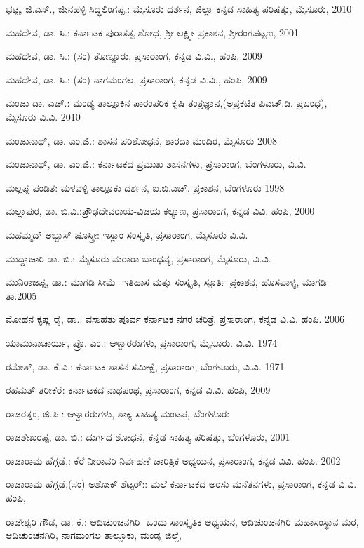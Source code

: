 \noindent
ಭಟ್ಟ, ಜಿ.ಎಸ್​., ಜೀನಹಳ್ಳಿ ಸಿದ್ಧಲಿಂಗಪ್ಪ,: ಮೈಸೂರು ದರ್ಶನ, ಜಿಲ್ಲಾ ಕನ್ನಡ ಸಾಹಿತ್ಯ ಪರಿಷತ್ತು, ಮೈಸೂರು, 2010

\noindent
ಮಹದೇವ, ಡಾ. ಸಿ.: ಕರ್ನಾಟಕ ಪುರಾತತ್ವ ಶೋಧ, ಶ‍್ರೀ ಲಕ್ಷ್ಮೀ ಪ್ರಕಾಶನ, ಶ‍್ರೀರಂಗಪಟ್ಟಣ, 2001

\noindent
ಮಹದೇವ, ಡಾ. ಸಿ.: (ಸಂ) ತೊಣ್ಣೂರು, ಪ್ರಸಾರಾಂಗ, ಕನ್ನಡ ವಿ.ವಿ., ಹಂಪಿ, 2009

\noindent
ಮಹದೇವ, ಡಾ. ಸಿ.: (ಸಂ) ನಾಗಮಂಗಲ, ಪ್ರಸಾರಾಂಗ, ಕನ್ನಡ ವಿ.ವಿ., ಹಂಪಿ, 2009

\noindent
ಮಂಜು ಡಾ. ಎಚ್​.: ಮಂಡ್ಯ ತಾಲ್ಲೂಕಿನ ಪಾರಂಪರಿಕ ಕೃಷಿ ತಂತ್ರಜ್ಞಾನ,(ಅಪ್ರಕಟಿತ ಪಿಎಚ್​.ಡಿ. ಪ್ರಬಂಧ), ಮೈಸೂರು ವಿ.ವಿ. 2010

\noindent
ಮಂಜುನಾಥ್​, ಡಾ. ಎಂ.ಜಿ.: ಶಾಸನ ಪರಿಶೋಧನೆ, ಶಾರದಾ ಮಂದಿರ, ಮೈಸೂರು 2008

\noindent
ಮಂಜುನಾಥ್​, ಡಾ. ಎಂ.ಜಿ.: ಕರ್ನಾಟಕದ ಪ್ರಮುಖ ಶಾಸನಗಳು, ಪ್ರಸಾರಾಂಗ, ಬೆಂಗಳೂರು, ವಿ.ವಿ.

\noindent
ಮಲ್ಲಪ್ಪ ಪಂಡಿತ: ಮಳವಳ್ಳಿ ತಾಲ್ಲೂಕು ದರ್ಶನ, ಐ.ಬಿ.ಎಚ್​. ಪ್ರಕಾಶನ, ಬೆಂಗಳೂರು 1998

\noindent
ಮಲ್ಲಾಪುರ, ಡಾ. ಬಿ.ವಿ.:ಪ್ರೌಢದೇವರಾಯ-ವಿಜಯ ಕಲ್ಯಾಣ, ಪ್ರಸಾರಾಂಗ, ಕನ್ನಡ ವಿವಿ. ಹಂಪಿ, 2000

\noindent
ಮಹಮ್ಮದ್​ ಅಬ್ಬಾಸ್​ ಷೂಸ್ತ್ರೀ: ಇಸ್ಲಾಂ ಸಂಸ್ಕೃತಿ, ಪ್ರಸಾರಾಂಗ, ಮೈಸೂರು ವಿ.ವಿ.

\noindent
ಮುದ್ದಾಚಾರಿ ಡಾ. ಬಿ.: ಮೈಸೂರು ಮರಾಠಾ ಬಾಂಧವ್ಯ, ಪ್ರಸಾರಾಂಗ, ಮೈಸೂರು, ವಿ.ವಿ. 

\noindent
ಮುನಿರಾಜಪ್ಪ, ಡಾ.: ಮಾಗಡಿ ಸೀಮೆ- ಇತಿಹಾಸ ಮತ್ತು ಸಂಸ್ಕೃತಿ, ಸ್ಫೂರ್ತಿ ಪ್ರಕಾಶನ, ಹೊಸಪಾಳ್ಯ, ಮಾಗಡಿ ತಾ.2005

\noindent
ಮೋಹನ ಕೃಷ್ಣ ರೈ, ಡಾ.: ವಸಾಹತು ಪೂರ್ವ ಕರ್ನಾಟಕ ನಗರ ಚರಿತ್ರೆ, ಪ್ರಸಾರಾಂಗ, ಕನ್ನಡ ವಿ.ವಿ. ಹಂಪಿ. 2006

\noindent
ಯಾಮುನಾಚಾರ್ಯ, ಪ್ರೊ. ಎಂ.: ಆಳ್ವಾರರುಗಳು, ಪ್ರಸಾರಾಂಗ, ಮೈಸೂರು. ವಿ.ವಿ. 1974

\noindent
ರಮೇಶ್​, ಡಾ. ಕೆ.ವಿ.: ಕರ್ನಾಟಕ ಶಾಸನ ಸಮೀಕ್ಷೆ, ಪ್ರಸಾರಾಂಗ, ಬೆಂಗಳೂರು, ವಿ.ವಿ. 1971

\noindent
ರಹಮತ್​ ತರೀಕೆರೆ: ಕರ್ನಾಟಕದ ನಾಥಪಂಥ, ಪ್ರಸಾರಾಂಗ, ಕನ್ನಡ ವಿ.ವಿ. ಹಂಪಿ, 2009

\noindent
ರಾಜರತ್ನಂ, ಜಿ.ಪಿ.: ಆಳ್ವಾರರುಗಳು, ಶಾಕ್ಯ ಸಾಹಿತ್ಯ ಮಂಟಪ, ಬೆಂಗಳೂರು

\noindent
ರಾಜಶೇಖರಪ್ಪ, ಡಾ. ಬಿ.: ದುರ್ಗದ ಶೋಧನೆ, ಕನ್ನಡ ಸಾಹಿತ್ಯ ಪರಿಷತ್ತು, ಬೆಂಗಳೂರು, 2001

\noindent
ರಾಜಾರಾಮ ಹೆಗ್ಗಡೆ,: ಕೆರೆ ನೀರಾವರಿ ನಿರ್ವಹಣೆ-ಚಾರಿತ್ರಿಕ ಅಧ್ಯಯನ, ಪ್ರಸಾರಾಂಗ, ಕನ್ನಡ ವಿವಿ. ಹಂಪಿ. 2002

\noindent
ರಾಜಾರಾಮ ಹೆಗ್ಗಡೆ,(ಸಂ) ಅಶೋಕ್​ ಶೆಟ್ಟರ್​:: ಮಲೆ ಕರ್ನಾಟಕದ ಅರಸು ಮನೆತನಗಳು, ಪ್ರಸಾರಾಂಗ, ಕನ್ನಡ ವಿ.ವಿ. ಹಂಪಿ,

\noindent
ರಾಜೇಶ್ವರಿ ಗೌಡ, ಡಾ. ಕೆ.: ಆದಿಚುಂಚನಗಿರಿ- ಒಂದು ಸಾಂಸ್ಕೃತಿಕ ಅಧ್ಯಯನ, ಆದಿಚುಂಚನಗಿರಿ ಮಹಾಸಂಸ್ಥಾನ ಮಠ, ಆದಿಚುಂಚನಗಿರಿ, ನಾಗಮಂಗಲ ತಾಲ್ಲೂಕು, ಮಂಡ್ಯ ಜಿಲ್ಲೆ,

